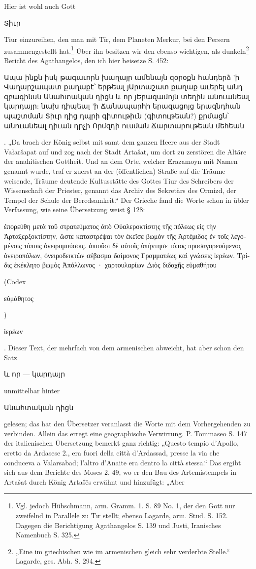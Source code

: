 \documentclass{article}
\begin{document}
Hier ist wohl auch Gott \begin{armenian}Տիւր\end{armenian} Tiur einzureihen, den man mit Tīr, dem Planeten Merkur, bei den Persern zusammengestellt hat.\footnote{Vgl. jedoch Hübschmann, arm. Gramm. 1. S. 89 No. 1, der den Gott nur zweifelnd in Parallele zu Tīr stellt; ebenso Lagarde, arm. Stud. S. 152. Dagegen die Berichtigung Agathangelos S. 139 und Justi, Iranisches Namenbuch S. 325.} Über ihn besitzen wir den ebenso wichtigen, als dunkeln\footnote{„Eine im griechischen wie im armenischen gleich sehr verderbte Stelle.“ Lagarde, ges. Abh. S. 294.} Bericht des Agathangelos, den ich hier beisetze S. 452: \begin{armenian}Ապա ինքն իսկ թագաւորն խաղայր ամենայն զօրօքն հանդերձ 'ի Վաղարշապատ քաղաքէ՝ երթեալ յԱրտաշատ քաղաք աւերել անդ զբագինսն Անահտական դիցն և որ յԵրազամոյն տեղին անուանեալ կարդայր: նախ դիպեալ 'ի Ճանապարհի երազացոյց երազնդհան պաշտման Տիւր դից դպրի գիտութիւն (գիտութեան?) քրմացն՝ անուանեալ դիւան դրչի Որմզդի ուսման Ճարտարութեան մեհեան\end{armenian}. „Da brach der König selbst mit samt dem ganzen Heere aus der Stadt Vałaršapat auf und zog nach der Stadt Artašat, um dort zu zerstören die Altäre der anahitischen Gottheit. Und an dem Orte, welcher Erazamoyn mit Namen genannt wurde, traf er zuerst an der (öffentlichen) Straße auf die Träume weisende, Träume deutende Kultusstätte des Gottes Tiur des Schreibers der Wissenschaft der Priester, genannt das Archiv des Sekretärs des Ormizd, der Tempel der Schule der Beredsamkeit.“ Der Grieche fand die Worte schon in übler Verfassung, wie seine Übersetzung weist § 128: \begin{greek}ἐπορεύθη μετὰ τοῦ στρατεύματος ἀπὸ Οὐαλεροκτίστης τῆς πόλεως εἰς τὴν Ἀρταξερξοκτίστην, ὥστε καταστρέψαι τὸν ἐκεῖσε βωμὸν τῆς Ἀρτέμιδος ἐν τοῖς λεγομένοις τόποις ὀνειρομούσοις. ἀπιοῦσι δὲ αὐτοῖς ὑπήντησε τόπος προσαγορευόμενος ὀνειροπόλων, ὀνειροδεικτῶν σέβασμα δαίμονος Γραμματέως καὶ γνώσεις ἱερέων. Τρίδις ἐκέκλητο βωμὸς Ἀπόλλωνος · χαρτουλαρίων Διὸς διδαχῆς εὐμαθήτου\end{greek} (Codex \begin{greek}εὐμάθητος\end{greek}) \begin{greek}ἱερέων\end{greek}. Dieser Text, der mehrfach von dem armenischen abweicht, hat aber schon den Satz \begin{armenian}և որ — կարդայր\end{armenian} unmittelbar hinter \begin{armenian}Անահտական դիցն\end{armenian} gelesen; das hat den Übersetzer veranlasst die Worte mit dem Vorhergehenden zu verbinden. Allein das erregt eine geographische Verwirrung. P. Tommaseo S. 147 der italienischen Übersetzung bemerkt ganz richtig: „Questo tempio d'Apollo, eretto da Ardasese 2., era fuori della città d'Ardassad, presse la via che conduceva a Valarsabad; l'altro d'Anaite era dentro la città stessa.“ Das ergibt sich aus dem Berichte des Moses 2. 49, wo er den Bau des Artemistempels in Artašat durch König Artašēs erwähnt und hinzufügt: „Aber 
\end{document}
